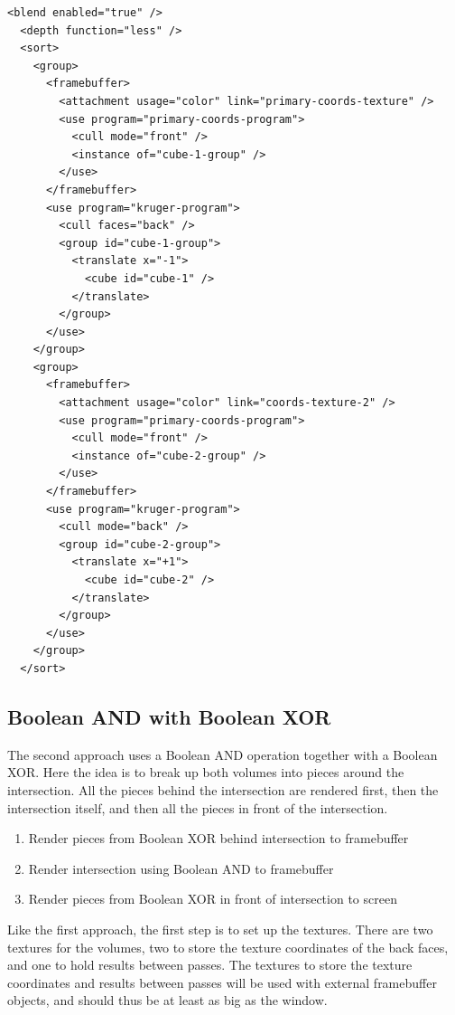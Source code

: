 \documentclass{article}
\begin{document}
\begin{Verbatim}[fontsize=\small]
  <blend enabled="true" />
  <depth function="less" />
  <sort>
    <group>
      <framebuffer>
        <attachment usage="color" link="primary-coords-texture" />
        <use program="primary-coords-program">
          <cull mode="front" />
          <instance of="cube-1-group" />
        </use>
      </framebuffer>
      <use program="kruger-program">
        <cull faces="back" />
        <group id="cube-1-group">
          <translate x="-1">
            <cube id="cube-1" />
          </translate>
        </group>
      </use>
    </group>
    <group>
      <framebuffer>
        <attachment usage="color" link="coords-texture-2" />
        <use program="primary-coords-program">
          <cull mode="front" />
          <instance of="cube-2-group" />
        </use>
      </framebuffer>
      <use program="kruger-program">
        <cull mode="back" />
        <group id="cube-2-group">
          <translate x="+1">
            <cube id="cube-2" />
          </translate>
        </group>
      </use>
    </group>
  </sort>
\end{Verbatim}

\subsection{Boolean AND with Boolean XOR}

The second approach uses a Boolean AND operation together with a Boolean XOR.
Here the idea is to break up both volumes into pieces around the intersection.
All the pieces behind the intersection are rendered first, then the intersection
itself, and then all the pieces in front of the intersection.

\begin{enumerate}
\item Render pieces from Boolean XOR behind intersection to framebuffer
\item Render intersection using Boolean AND to framebuffer
\item Render pieces from Boolean XOR in front of intersection to screen
\end{enumerate}

Like the first approach, the first step is to set up the textures.  There are
two textures for the volumes, two to store the texture coordinates of the back
faces, and one to hold results between passes.  The textures to store the
texture coordinates and results between passes will be used with external
framebuffer objects, and should thus be at least as big as the window.
\end{document}
